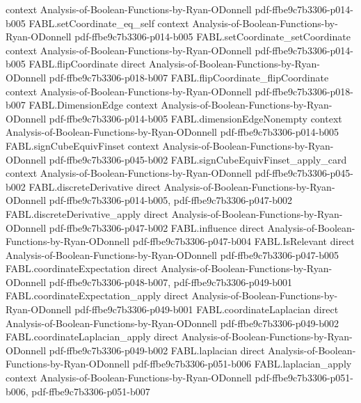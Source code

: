\begin{theorem}
  {context}
  {Analysis-of-Boolean-Functions-by-Ryan-ODonnell}
  {pdf-ffbe9c7b3306-p014-b005}
\proofstep
  {FABL.setCoordinate_eq_self}
  {context}
  {Analysis-of-Boolean-Functions-by-Ryan-ODonnell}
  {pdf-ffbe9c7b3306-p014-b005}
\proofstep
  {FABL.setCoordinate_setCoordinate}
  {context}
  {Analysis-of-Boolean-Functions-by-Ryan-ODonnell}
  {pdf-ffbe9c7b3306-p014-b005}
\proofstep
  {FABL.flipCoordinate}
  {direct}
  {Analysis-of-Boolean-Functions-by-Ryan-ODonnell}
  {pdf-ffbe9c7b3306-p018-b007}
\proofstep
  {FABL.flipCoordinate_flipCoordinate}
  {context}
  {Analysis-of-Boolean-Functions-by-Ryan-ODonnell}
  {pdf-ffbe9c7b3306-p018-b007}
\proofstep
  {FABL.DimensionEdge}
  {context}
  {Analysis-of-Boolean-Functions-by-Ryan-ODonnell}
  {pdf-ffbe9c7b3306-p014-b005}
\proofstep
  {FABL.dimensionEdgeNonempty}
  {context}
  {Analysis-of-Boolean-Functions-by-Ryan-ODonnell}
  {pdf-ffbe9c7b3306-p014-b005}
\proofstep
  {FABL.signCubeEquivFinset}
  {context}
  {Analysis-of-Boolean-Functions-by-Ryan-ODonnell}
  {pdf-ffbe9c7b3306-p045-b002}
\proofstep
  {FABL.signCubeEquivFinset_apply_card}
  {context}
  {Analysis-of-Boolean-Functions-by-Ryan-ODonnell}
  {pdf-ffbe9c7b3306-p045-b002}
\proofstep
  {FABL.discreteDerivative}
  {direct}
  {Analysis-of-Boolean-Functions-by-Ryan-ODonnell}
  {pdf-ffbe9c7b3306-p014-b005,
    pdf-ffbe9c7b3306-p047-b002}
\proofstep
  {FABL.discreteDerivative_apply}
  {direct}
  {Analysis-of-Boolean-Functions-by-Ryan-ODonnell}
  {pdf-ffbe9c7b3306-p047-b002}
\proofstep
  {FABL.influence}
  {direct}
  {Analysis-of-Boolean-Functions-by-Ryan-ODonnell}
  {pdf-ffbe9c7b3306-p047-b004}
\proofstep
  {FABL.IsRelevant}
  {direct}
  {Analysis-of-Boolean-Functions-by-Ryan-ODonnell}
  {pdf-ffbe9c7b3306-p047-b005}
\proofstep
  {FABL.coordinateExpectation}
  {direct}
  {Analysis-of-Boolean-Functions-by-Ryan-ODonnell}
  {pdf-ffbe9c7b3306-p048-b007,
    pdf-ffbe9c7b3306-p049-b001}
\proofstep
  {FABL.coordinateExpectation_apply}
  {direct}
  {Analysis-of-Boolean-Functions-by-Ryan-ODonnell}
  {pdf-ffbe9c7b3306-p049-b001}
\proofstep
  {FABL.coordinateLaplacian}
  {direct}
  {Analysis-of-Boolean-Functions-by-Ryan-ODonnell}
  {pdf-ffbe9c7b3306-p049-b002}
\proofstep
  {FABL.coordinateLaplacian_apply}
  {direct}
  {Analysis-of-Boolean-Functions-by-Ryan-ODonnell}
  {pdf-ffbe9c7b3306-p049-b002}
\proofstep
  {FABL.laplacian}
  {direct}
  {Analysis-of-Boolean-Functions-by-Ryan-ODonnell}
  {pdf-ffbe9c7b3306-p051-b006}
\proofstep
  {FABL.laplacian_apply}
  {context}
  {Analysis-of-Boolean-Functions-by-Ryan-ODonnell}
  {pdf-ffbe9c7b3306-p051-b006,
    pdf-ffbe9c7b3306-p051-b007}

\end{theorem}
